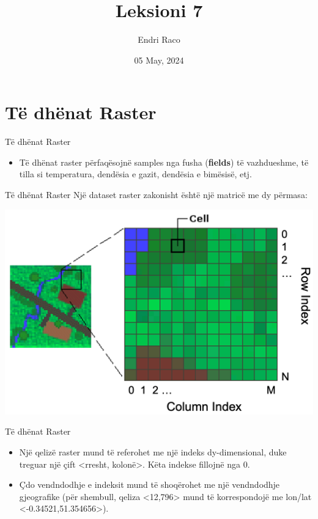 \documentclass[
  ignorenonframetext,
]{beamer}
\title{Leksioni 7}
\author{Endri Raco}
\date{05 May, 2024}
\providecommand{\tightlist}{%
  \setlength{\itemsep}{0pt}\setlength{\parskip}{0pt}}
\begin{document}
\frame{\titlepage}

\begin{frame}[allowframebreaks]
  \tableofcontents[hideallsubsections]
\end{frame}
\hypertarget{tuxeb-dhuxebnat-raster}{%
\section{Të dhënat Raster}\label{tuxeb-dhuxebnat-raster}}

\begin{frame}{Të dhënat Raster}
\protect\hypertarget{tuxeb-dhuxebnat-raster-1}{}
\begin{itemize}
\tightlist
\item
  Të dhënat raster përfaqësojnë samples nga fusha (\textbf{fields}) të
  vazhdueshme, të tilla si temperatura, dendësia e gazit, dendësia e
  bimësisë, etj.
\end{itemize}
\end{frame}

\begin{frame}{Të dhënat Raster}
\protect\hypertarget{tuxeb-dhuxebnat-raster-2}{}
Një dataset raster zakonisht është një matricë me dy përmasa:

\includegraphics{./Figs/raster_matrix1.png}
\end{frame}

\begin{frame}{Të dhënat Raster}
\protect\hypertarget{tuxeb-dhuxebnat-raster-3}{}
\begin{itemize}
\item
  Një qelizë raster mund të referohet me një indeks dy-dimensional, duke
  treguar një çift \textless rresht, kolonë\textgreater. Këta indekse
  fillojnë nga 0.
\item
  Çdo vendndodhje e indeksit mund të shoqërohet me një vendndodhje
  gjeografike (për shembull, qeliza \textless12,796\textgreater{} mund
  të korrespondojë me lon/lat \textless-0.34521,51.354656\textgreater).
\end{itemize}
\end{frame}
\end{document}
